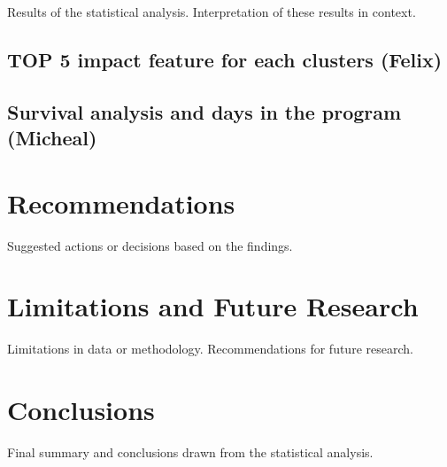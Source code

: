 \documentclass[12pt]{article}
\begin{document}
Results of the statistical analysis.
Interpretation of these results in context.

\subsection{TOP 5 impact feature for each clusters (Felix)}

\subsection{Survival analysis and days in the program (Micheal)}

\section{Recommendations}

Suggested actions or decisions based on the findings.

\section{Limitations and Future Research}

Limitations in data or methodology.
Recommendations for future research.

\section{Conclusions}

Final summary and conclusions drawn from the statistical analysis.


\newpage
%
%

 
\end{document}
